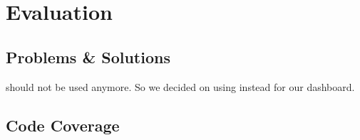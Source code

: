 \section{Evaluation}
\label{sec:evaluation}

\subsection{Problems \& Solutions}
\label{subsec:problems_solutions}

\cite{node-red-dashboard-deprecated} should not be used anymore.
So we decided on using \cite{Knight_node-red-contrib-uibuilder} instead for our dashboard.

\subsection{Code Coverage}
\label{subsec:code_coverage}

